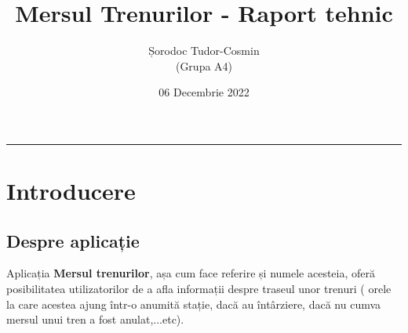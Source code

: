 \documentclass[runningheads]{llncs}
\begin{document}
	\title{Mersul Trenurilor - Raport tehnic}
	\author{Șorodoc Tudor-Cosmin \\ (Grupa A4)}
	\date{06 Decembrie 2022}
	\maketitle              %
	\begin{center}
	\end{center}
	\par\noindent\rule{\textwidth}{0.4pt}
	\section{Introducere}
	\subsection{Despre aplicație}
	Aplicația \textbf{Mersul trenurilor}, așa cum face referire și numele acesteia,
	oferă posibilitatea utilizatorilor de a afla informații despre traseul unor trenuri
	( orele la care acestea ajung într-o anumită stație, dacă au întârziere, dacă nu cumva mersul unui tren a fost anulat,...etc).
\end{document}
